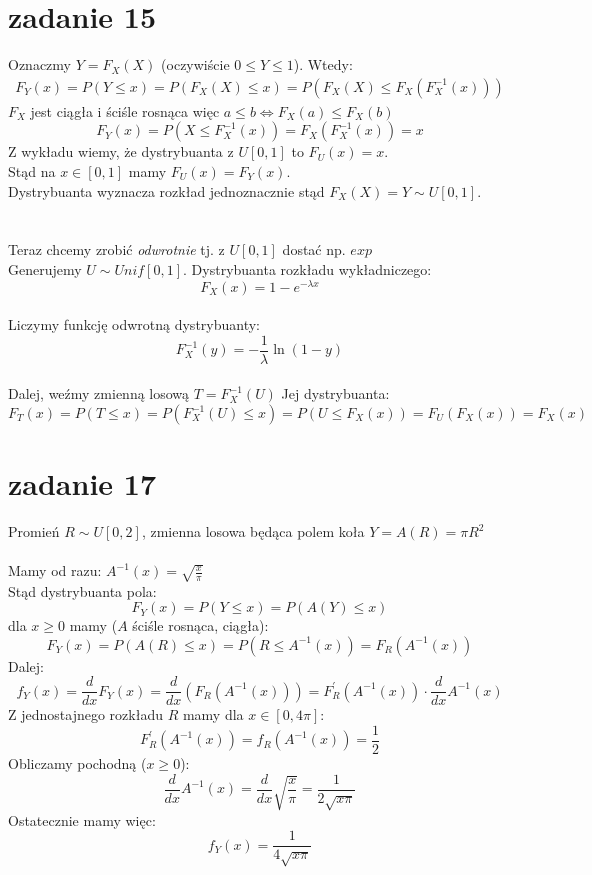 \documentclass{article}
\begin{document}
\section{zadanie 15}
Oznaczmy $Y = F_X(X)$ (oczywiście $0 \leq Y \leq 1$). Wtedy:
\begin{align*}
F_Y(x) = P(Y\leq x)= P(F_X(X) \leq x) =P(F_X(X) \leq F_X(F_X^{-1}(x)))
\end{align*}
$F_X$ jest ciągła i ściśle rosnąca więc $a \leq b \iff F_X(a) \leq F_X(b)$
$$
F_Y(x) = P(X \leq F_X^{-1}(x)) = F_X(F_X^{-1}(x)) = x
$$
Z wykładu wiemy, że dystrybuanta z $U[0,1]$ to $F_U(x) = x$.\\
Stąd na $x \in [0,1]$ mamy $F_U(x) = F_Y(x)$. \\Dystrybuanta wyznacza rozkład jednoznacznie stąd $F_X(X) = Y \sim U[0,1]$.\\\\\\
Teraz chcemy zrobić \textit{odwrotnie} tj. z $U[0,1]$ dostać np. $exp$\\
Generujemy $U \sim Unif[0,1].$ Dystrybuanta rozkładu wykładniczego: $$F_X(x) = 1-e^{-\lambda x}$$\\
Liczymy funkcję odwrotną dystrybuanty: $$F_X^{-1}(y) = -\frac1\lambda \ln(1-y)$$\\
Dalej, weźmy zmienną losową $T = F_X^{-1}(U)$ Jej dystrybuanta:
$$
F_T(x) = P(T \leq x) = P(F_X^{-1}(U) \leq x) = P(U \leq F_X(x)) = F_U(F_X(x)) = F_X(x)
$$

\newpage
\section{zadanie 17}
Promień $R \sim U[0,2]$, %
zmienna losowa będąca polem koła $Y = A(R) =  \pi R^2$\\\\
Mamy od razu: $A^{-1}(x) = \sqrt{\frac x \pi}$ \\Stąd dystrybuanta pola:
$$
F_Y(x) = P(Y \leq x) = P(A(Y) \leq x)
$$
dla $x \geq 0$ mamy ($A$ ściśle rosnąca, ciągła):
$$
F_Y(x) = P(A(R) \leq x) = P(R \leq A^{-1}(x)) = F_R(A^{-1}(x))
$$
Dalej:
$$
f_Y(x) = \frac{d}{dx}F_Y(x) = \frac{d}{dx} \left ( F_R(A^{-1}(x))\right) = F_R^\prime(A^{-1}(x)) \cdot \frac{d}{dx}A^{-1}(x)
$$
Z jednostajnego rozkładu $R$ mamy dla $x \in [0, 4\pi]$:
$$
F_R^\prime(A^{-1}(x)) = f_R(A^{-1}(x)) = \frac 1 2
$$
Obliczamy pochodną ($x\geq0$):
$$
\frac{d}{dx}A^{-1}(x) = \frac{d}{dx}\sqrt{\frac x \pi} = \frac{1}{2\sqrt{x\pi}}
$$
Ostatecznie mamy więc:
$$
f_Y(x) = \frac{1}{4\sqrt{x\pi}}
$$
\end{document}
